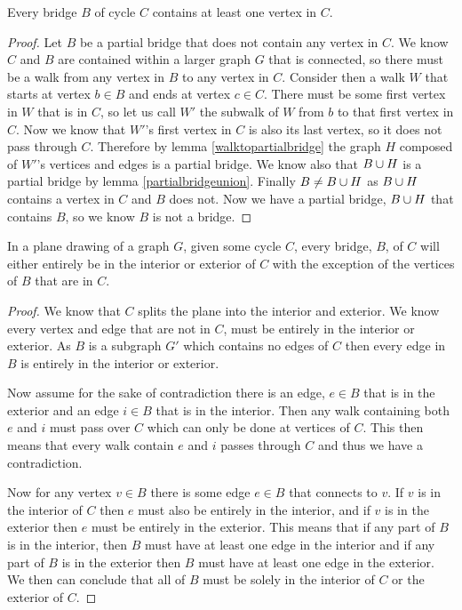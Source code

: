 \documentclass{article}
\begin{document}
\begin{lemma}
	Every bridge $B$ of cycle $C$ contains at least one vertex in $C$.
\end{lemma}
\begin{proof}
	Let $B$ be a partial bridge that does not contain any vertex in $C$. We know $C$ and $B$ are contained within a larger graph $G$ that is connected, so there must be a walk from any vertex in $B$ to any vertex in $C$. Consider then a walk $W$ that starts at vertex $b\in B$ and ends at vertex $c\in C$. There must be some first vertex in $W$ that is in $C$, so let us call $W'$ the subwalk of $W$ from $b$ to that first vertex in $C$. Now we know that $W'$'s first vertex in $C$ is also its last vertex, so it does not pass through $C$. Therefore by lemma \ref{walktopartialbridge} the graph $H$ composed of $W'$'s vertices and edges is a partial bridge. We know also that $B\cup H$ is a partial bridge by lemma \ref{partialbridgeunion}. Finally $B\not=B\cup H$ as $B\cup H$ contains a vertex in $C$ and $B$ does not. Now we have a partial bridge, $B\cup H$ that contains $B$, so we know $B$ is not a bridge.
\end{proof}


\begin{lemma}
	In a plane drawing of a graph $G$, given some cycle $C$, every bridge, $B$, of $C$ will either entirely be in the interior or exterior of $C$ with the exception of the vertices of $B$ that are in $C$.
\end{lemma}
\begin{proof}
	We know that $C$ splits the plane into the interior and exterior. We know every vertex and edge that are not in $C$, must be entirely in the interior or exterior. As $B$ is a subgraph $G'$ which contains no edges of $C$ then every edge in $B$ is entirely in the interior or exterior.
	
	Now assume for the sake of contradiction there is an edge, $e\in B$ that is in the exterior and an edge $i\in B$ that is in the interior. Then any walk containing both $e$ and $i$ must pass over $C$ which can only be done at vertices of $C$. This then means that every walk contain $e$ and $i$ passes through $C$ and thus we have a contradiction.
	
	Now for any vertex $v\in B$ there is some edge $e\in B$ that connects to $v$. If $v$ is in the interior of $C$ then $e$ must also be entirely in the interior, and if $v$ is in the exterior then $e$ must be entirely in the exterior. This means that if any part of $B$ is in the interior, then $B$ must have at least one edge in the interior and if any part of $B$ is in the exterior then $B$ must have at least one edge in the exterior. We then can conclude that all of $B$ must be solely in the interior of $C$ or the exterior of $C$.
\end{proof}
\end{document}
